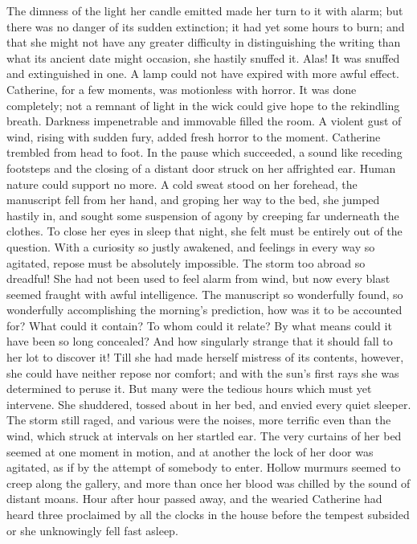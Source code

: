 The dimness of the light her candle emitted made her turn to it with alarm; but there was no danger of its sudden extinction; it had yet some hours to burn; and that she might not have any greater difficulty in distinguishing the writing than what its ancient date might occasion, she hastily snuffed it. Alas! It was snuffed and extinguished in one. A lamp could not have expired with more awful effect. Catherine, for a few moments, was motionless with horror. It was done completely; not a remnant of light in the wick could give hope to the rekindling breath. Darkness impenetrable and immovable filled the room. A violent gust of wind, rising with sudden fury, added fresh horror to the moment. Catherine trembled from head to foot. In the pause which succeeded, a sound like receding footsteps and the closing of a distant door struck on her affrighted ear. Human nature could support no more. A cold sweat stood on her forehead, the manuscript fell from her hand, and groping her way to the bed, she jumped hastily in, and sought some suspension of agony by creeping far underneath the clothes. To close her eyes in sleep that night, she felt must be entirely out of the question. With a curiosity so justly awakened, and feelings in every way so agitated, repose must be absolutely impossible. The storm too abroad so dreadful! She had not been used to feel alarm from wind, but now every blast seemed fraught with awful intelligence. The manuscript so wonderfully found, so wonderfully accomplishing the morning's prediction, how was it to be accounted for? What could it contain? To whom could it relate? By what means could it have been so long concealed? And how singularly strange that it should fall to her lot to discover it! Till she had made herself mistress of its contents, however, she could have neither repose nor comfort; and with the sun's first rays she was determined to peruse it. But many were the tedious hours which must yet intervene. She shuddered, tossed about in her bed, and envied every quiet sleeper. The storm still raged, and various were the noises, more terrific even than the wind, which struck at intervals on her startled ear. The very curtains of her bed seemed at one moment in motion, and at another the lock of her door was agitated, as if by the attempt of somebody to enter. Hollow murmurs seemed to creep along the gallery, and more than once her blood was chilled by the sound of distant moans. Hour after hour passed away, and the wearied Catherine had heard three proclaimed by all the clocks in the house before the tempest subsided or she unknowingly fell fast asleep.

